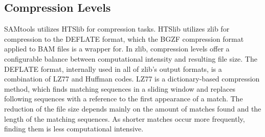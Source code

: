 \subsection{Compression Levels}\label{clevels}
SAMtools utilizes HTSlib for compression tasks. HTSlib utilizes zlib for compression to the DEFLATE format, which the BGZF compression format applied to BAM files is a wrapper for.
In zlib, compression levels offer a configurable balance between computational intensity and resulting file size. The DEFLATE format, internally used in all of zlib's output formats, is a combination of LZ77 and Huffman codes. LZ77 is a dictionary-based compression method, which finds matching sequences in a sliding window and replaces following sequences with a reference to the first appearance of a match. The reduction of the file size depends mainly on the amount of matches found and the length of the matching sequences. As shorter matches occur more frequently, finding them is less computational intensive.

